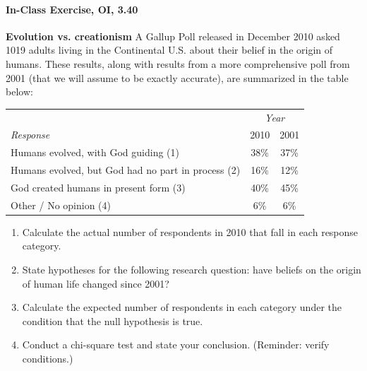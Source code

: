 \documentclass[10pt]{article}\usepackage[]{graphicx}\usepackage[]{color}
\begin{document}
\paragraph{In-Class Exercise, OI, 3.40}

\textbf{Evolution vs. creationism} A Gallup Poll released in December 2010 asked 1019 adults living in the Continental U.S. about their belief in the origin of humans. These results, along with results from a more comprehensive poll from 2001 (that we will assume to be exactly accurate), are summarized in the table below: 
\begin{center}
\begin{tabular}{l c c}
  										& \multicolumn{2}{c}{\textit{Year}} \\
\cline{2-3}
\textit{Response}								& 2010	& 2001 \\
\hline
Humans evolved, with God guiding (1)				& 38\% 	& 37\% \\
Humans evolved, but God had no part in process (2) 	& 16\% 	& 12\% \\
God created humans  in present form (3) 				& 40\% 	& 45\% \\
Other / No opinion (4)							& 6\% 	& 6\% \\
\hline
\end{tabular}
\end{center} 

\begin{enumerate}
  \itemsep1.5in
\item Calculate the actual number of respondents in 2010 that fall in each response category.
\item State hypotheses for the following research question: have beliefs on the origin of human life changed since 2001?
\item Calculate the expected number of respondents in each category under the condition that the null hypothesis is true.
\item Conduct a chi-square test and state your conclusion. (Reminder: verify conditions.)
\end{enumerate}
\end{document}
